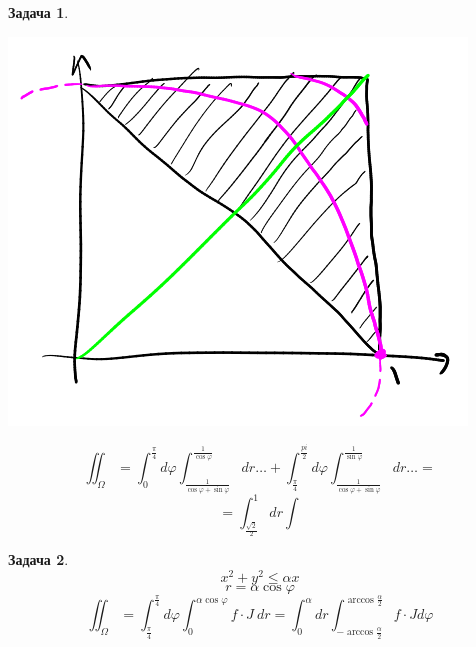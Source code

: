 \documentclass[english]{article}
\theoremstyle{plain}
\theoremstyle{remark}
\theoremstyle{definition}
\newtheorem{task}{Задача}
\begin{document}
\begin{task}
\-
\begin{center}
\includegraphics[scale=0.3]{3_5.png}
\end{center}
\[ \iint_\Omega = \int^{\frac{\pi}{4}}_0 d\varphi \int^{\frac{1}{\cos\varphi}}_{\frac{1}{\cos\varphi + \sin\varphi}} dr \dots + \int^{\frac{pi}{2}}_{\frac{\pi}{4}} d\varphi \int_{\frac{1}{\cos\varphi + \sin\varphi}}^{\frac{1}{\sin\varphi}} dr \dots = \]
\[ = \int_{\frac{\sqrt{2}}{2}}^1 dr \int \]
\end{task}
\begin{task}
\[ x^2 + y^2 \le \alpha x \]
\[ r = \alpha \cos\varphi \]
\[ \iint_\Omega = \int^{\frac{\pi}{4}}_{\frac{\pi}{4}}d\varphi\int^{\alpha\cos\varphi}_0 f\cdot J\ dr = \int^\alpha_0 dr \int^{\arccos \frac{\alpha}{2}}_{-\arccos \frac{\alpha}{2}} f\cdot J d\varphi \]
\end{task}
\end{document}
